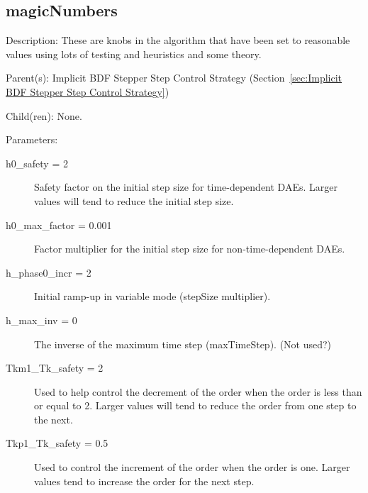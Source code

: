 \subsection{magicNumbers}
\label{sec:magicNumbers}

\begin{list}{}
  {\setlength{\leftmargin}{1.0in}
   \setlength{\labelwidth}{0.75in}
   \setlength{\labelsep}{0.125in}}
  \item[Description:]
    These are knobs in the algorithm that have been set to reasonable values using lots of testing and heuristics and some theory.
  \item[Parent(s):]
    Implicit BDF Stepper Step Control Strategy (Section~\ref{sec:Implicit BDF Stepper Step Control Strategy})
  \item[Child(ren):]
    None. 
  \item[Parameters:]
    \begin{description}
      \item[h0\_safety = 2] 
Safety factor on the initial step size for time-dependent DAEs.  Larger values will tend to reduce the initial step size.
      \item[h0\_max\_factor = 0.001] 
Factor multiplier for the initial step size for non-time-dependent DAEs.
      \item[h\_phase0\_incr = 2] 
Initial ramp-up in variable mode (stepSize multiplier).
      \item[h\_max\_inv = 0] 
The inverse of the maximum time step (maxTimeStep). (Not used?)
      \item[Tkm1\_Tk\_safety = 2] 
Used to help control the decrement of the order when the order is less than or equal to 2.  Larger values will tend to reduce the order from one step to the next.
      \item[Tkp1\_Tk\_safety = 0.5] 
Used to control the increment of the order when the order is one.  Larger values tend to increase the order for the next step.

\end{description}
\end{list}
